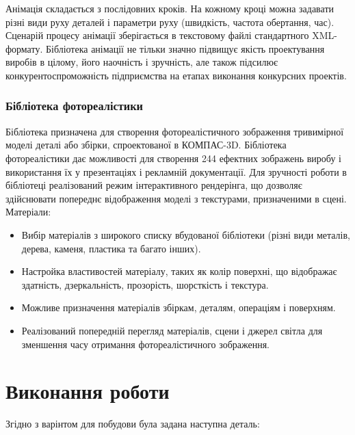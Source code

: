 Анімація складається з послідовних кроків. На кожному кроці можна задавати різні види
руху деталей і параметри руху (швидкість, частота обертання, час). Сценарій процесу анімації
зберігається в текстовому файлі стандартного XML-формату. Бібліотека анімації не тільки значно
підвищує якість проектування виробів в цілому, його наочність і зручність, але також підсилює
конкурентоспроможність підприємства на етапах виконання конкурсних проектів.

\subsubsection{Бібліотека фотореалістики}
Бібліотека призначена для створення фотореалістичного зображення тривимірної моделі деталі або
збірки, спроектованої в КОМПАС-3D. Бібліотека фотореалістики дає можливості для створення 244
ефектних зображень виробу і використання їх у презентаціях і рекламній документації. Для зручності
роботи в бібліотеці реалізований режим інтерактивного рендерінга, що дозволяє здійснювати попереднє
відображення моделі з текстурами, призначеними в сцені. Матеріали:


\begin{itemize}
\item Вибір матеріалів з широкого списку вбудованої бібліотеки (різні види металів, дерева, каменя,
  пластика та багато інших).
\item Настройка властивостей матеріалу, таких як колір поверхні, що відображає здатність,
  дзеркальність, прозорість, шорсткість і текстура.
\item Можливе призначення матеріалів збіркам, деталям, операціям і поверхням.
\item Реалізований попередній перегляд матеріалів, сцени і джерел світла для зменшення часу
  отримання фотореалістичного зображення.
\end{itemize}

\section{Виконання роботи}

Згідно з варінтом для побудови була задана наступна деталь:

